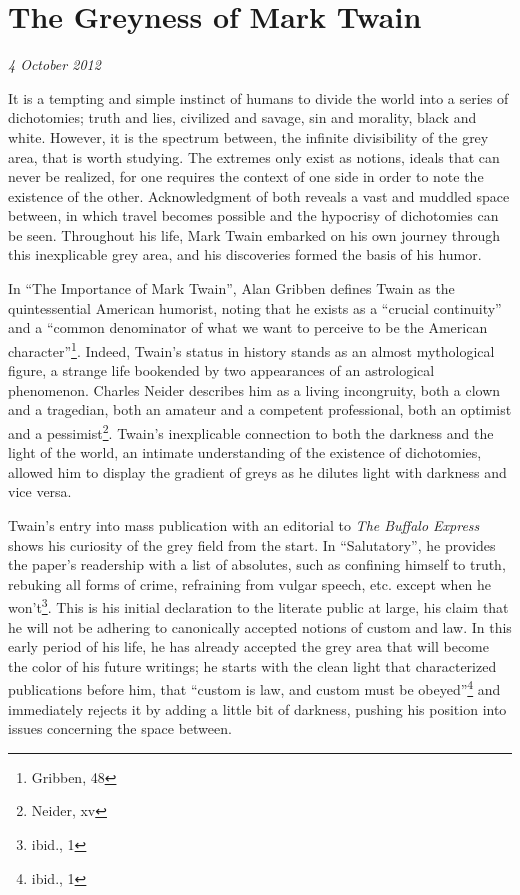 \section{The Greyness of Mark Twain}%

\textit{4 October 2012}

It is a tempting and simple instinct of humans to divide the world into a series
of dichotomies; truth and lies, civilized and savage, sin and morality, black
and white. However, it is the spectrum between, the infinite divisibility of the
grey area, that is worth studying. The extremes only exist as notions, ideals
that can never be realized, for one requires the context of one side in order to
note the existence of the other. Acknowledgment of both reveals a vast and
muddled space between, in which travel becomes possible and the hypocrisy of
dichotomies can be seen. Throughout his life, Mark Twain embarked on his own
journey through this inexplicable grey area, and his discoveries formed the
basis of his humor.

In ``The Importance of Mark Twain'', Alan Gribben defines Twain as the
quintessential American humorist, noting that he exists as a ``crucial
continuity'' and a ``common denominator of what we want to perceive to be the
American character''\footnote{Gribben, 48}. Indeed, Twain's status in history stands as
an almost mythological figure, a strange life bookended by two appearances of an
astrological phenomenon. Charles Neider describes him as a living incongruity,
both a clown and a tragedian, both an amateur and a competent professional, both
an optimist and a pessimist\footnote{Neider, xv}. Twain's inexplicable connection to both
the darkness and the light of the world, an intimate understanding of the
existence of dichotomies, allowed him to display the gradient of greys as he
dilutes light with darkness and vice versa.

Twain's entry into mass publication with an editorial to \textit{The Buffalo
Express} shows his curiosity of the grey field from the start. In
``Salutatory'', he provides the paper's readership with a list of absolutes,
such as confining himself to truth, rebuking all forms of crime, refraining from
vulgar speech, etc. except when he won't\footnote{ibid., 1}. This is his initial
declaration to the literate public at large, his claim that he will not be
adhering to canonically accepted notions of custom and  law. In this early
period of his life, he has already accepted the grey area that will become the
color of his future writings; he starts with the clean light that characterized
publications before him, that ``custom is law, and custom must be
obeyed''\footnote{ibid., 1} and immediately rejects it by adding a little bit of
darkness, pushing his position into issues concerning the space between.

